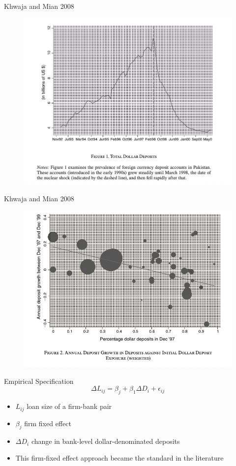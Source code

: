 \documentclass[english,xcolor=svgnames]{beamer}
\begin{document}
\begin{frame}{Khwaja and Mian 2008}
\begin{figure}
\includegraphics[scale=0.35]{figures/km_1}
\end{figure}
\end{frame}


\begin{frame}{Khwaja and Mian 2008}
\begin{figure}
\includegraphics[scale=0.35]{figures/km_2}
\end{figure}
\end{frame}


\begin{frame}{Empirical Specification}
$$\Delta L_{ij} = \beta_j + \beta_1 \Delta D_i + \epsilon_{ij}$$
\begin{itemize}
\item $L_{ij}$ loan size of a firm-bank pair
\item $\beta_j$ firm fixed effect
\item $\Delta D_i$ change in bank-level dollar-denominated deposits
\item This firm-fixed effect approach became the standard in the literature
\end{itemize}
\end{frame}
\end{document}
